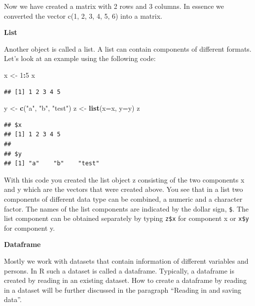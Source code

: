 \documentclass[]{book}
\newenvironment{Shaded}{\begin{snugshade}}{\end{snugshade}}
\newcommand{\KeywordTok}[1]{\textcolor[rgb]{0.13,0.29,0.53}{\textbf{#1}}}
\newcommand{\DataTypeTok}[1]{\textcolor[rgb]{0.13,0.29,0.53}{#1}}
\newcommand{\DecValTok}[1]{\textcolor[rgb]{0.00,0.00,0.81}{#1}}
\newcommand{\StringTok}[1]{\textcolor[rgb]{0.31,0.60,0.02}{#1}}
\newcommand{\OperatorTok}[1]{\textcolor[rgb]{0.81,0.36,0.00}{\textbf{#1}}}
\newcommand{\NormalTok}[1]{#1}
\begin{document}
Now we have created a matrix with 2 rows and 3 columns. In essence we
converted the vector c(1, 2, 3, 4, 5, 6) into a matrix.

\textbf{List}

Another object is called a list. A list can contain components of
different formats. Let's look at an example using the following code:

\begin{Shaded}
\begin{Highlighting}[]
\NormalTok{x <-}\StringTok{ }\DecValTok{1}\OperatorTok{:}\DecValTok{5}
\NormalTok{x}
\end{Highlighting}
\end{Shaded}

\begin{verbatim}
## [1] 1 2 3 4 5
\end{verbatim}

\begin{Shaded}
\begin{Highlighting}[]
\NormalTok{y <-}\StringTok{ }\KeywordTok{c}\NormalTok{(}\StringTok{"a"}\NormalTok{, }\StringTok{"b"}\NormalTok{, }\StringTok{"test"}\NormalTok{)}
\NormalTok{z <-}\StringTok{ }\KeywordTok{list}\NormalTok{(}\DataTypeTok{x=}\NormalTok{x, }\DataTypeTok{y=}\NormalTok{y)}
\NormalTok{z}
\end{Highlighting}
\end{Shaded}

\begin{verbatim}
## $x
## [1] 1 2 3 4 5
## 
## $y
## [1] "a"    "b"    "test"
\end{verbatim}

With this code you created the list object z consisting of the two
components x and y which are the vectors that were created above. You
see that in a list two components of different data type can be
combined, a numeric and a character factor. The names of the list
components are indicated by the dollar sign, \texttt{\$}. The list
component can be obtained separately by typing \texttt{z\$x} for
component x or \texttt{x\$y} for component y.

\textbf{Dataframe}

Mostly we work with datasets that contain information of different
variables and persons. In R such a dataset is called a dataframe.
Typically, a dataframe is created by reading in an existing dataset. How
to create a dataframe by reading in a dataset will be further discussed
in the paragraph ``Reading in and saving data''.
\end{document}
